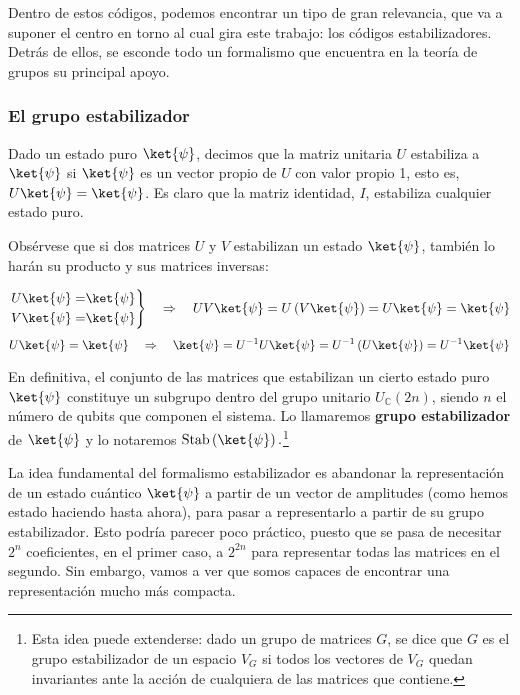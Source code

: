 \documentclass[11pt,a4paper,twoside,pdf]{article}
\numberwithin{equation}{section}
\begin{document}
	Dentro de estos códigos, podemos encontrar un tipo de gran relevancia, que va a suponer el centro en torno al cual gira este trabajo: los códigos estabilizadores. Detrás de ellos, se esconde todo un formalismo que encuentra en la teoría de grupos su principal apoyo.
	
		\subsubsection{El grupo estabilizador}
		
		Dado un estado puro $\ket{\psi}$, decimos que la matriz unitaria $U$ estabiliza a $\ket{\psi}$ si $\ket{\psi}$ es un vector propio de $U$ con valor propio 1, esto es, $U\ket{\psi}=\ket{\psi}$. Es claro que la matriz identidad, $I$, estabiliza cualquier estado puro.
		
		Obsérvese que si dos matrices $U$ y $V$ estabilizan un estado $\ket{\psi}$, también lo harán su producto y sus matrices inversas:
		
			\begin{equation*}
				\left.\begin{aligned} U\ket{\psi} =& \ket{\psi}  \\ V\ket{\psi}=&\ket{\psi} \end{aligned}\right\} \quad \Rightarrow \quad UV\ket{\psi}=U\left( V\ket{\psi} \right)=U \ket{\psi}= \ket{\psi}	
			\end{equation*}
			\begin{equation*}
				U\ket{\psi} = \ket{\psi} \quad \Rightarrow \quad \ket{\psi} = U^{-1}U\ket{\psi} = U^{-1} \left( U \ket{\psi} \right) = U^{-1} \ket{\psi}
			\end{equation*}
			
		En definitiva, el conjunto de las matrices que estabilizan un cierto estado puro $\ket{\psi}$ constituye un subgrupo dentro del grupo unitario $U_\mathbb{C}(2n)$, siendo $n$ el número de qubits que componen el sistema. Lo llamaremos \textbf{grupo estabilizador} de $\ket{\psi}$ y lo notaremos $\text{Stab}\left(\ket{\psi}\right).$\footnote{ Esta idea puede extenderse: dado un grupo de matrices $G$, se dice que $G$ es el grupo estabilizador de un espacio $V_G$ si todos los vectores de $V_G$  quedan invariantes ante la acción de cualquiera de las matrices que contiene.} 
	
		La idea fundamental del formalismo estabilizador es abandonar la representación de un estado cuántico $\ket{\psi}$ a partir de un vector de amplitudes (como hemos estado haciendo hasta ahora), para pasar a representarlo a partir de su grupo estabilizador. Esto podría parecer poco práctico, puesto que se pasa de necesitar $2^n$ coeficientes, en el primer caso, a $2^{2n}$ para representar todas las matrices en el segundo. Sin embargo, vamos a ver que somos capaces de encontrar una representación mucho más compacta. 
		
\end{document}
